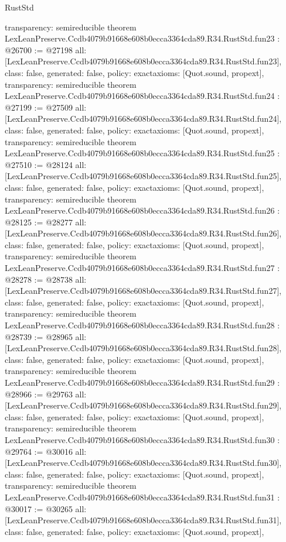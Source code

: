 \begin{lexlean}{RustStd}
\begin{coremodule}
{  transparency: semireducible
}
theorem LexLeanPreserve.Ccdb4079b91668e608b0ecca3364cda89.R34.RustStd.fun23 : @26700 := @27198 {
  all: [LexLeanPreserve.Ccdb4079b91668e608b0ecca3364cda89.R34.RustStd.fun23],
  class: false,
  generated: false,
  policy: exact{axioms: [Quot.sound, propext]},
  transparency: semireducible
}
theorem LexLeanPreserve.Ccdb4079b91668e608b0ecca3364cda89.R34.RustStd.fun24 : @27199 := @27509 {
  all: [LexLeanPreserve.Ccdb4079b91668e608b0ecca3364cda89.R34.RustStd.fun24],
  class: false,
  generated: false,
  policy: exact{axioms: [Quot.sound, propext]},
  transparency: semireducible
}
theorem LexLeanPreserve.Ccdb4079b91668e608b0ecca3364cda89.R34.RustStd.fun25 : @27510 := @28124 {
  all: [LexLeanPreserve.Ccdb4079b91668e608b0ecca3364cda89.R34.RustStd.fun25],
  class: false,
  generated: false,
  policy: exact{axioms: [Quot.sound, propext]},
  transparency: semireducible
}
theorem LexLeanPreserve.Ccdb4079b91668e608b0ecca3364cda89.R34.RustStd.fun26 : @28125 := @28277 {
  all: [LexLeanPreserve.Ccdb4079b91668e608b0ecca3364cda89.R34.RustStd.fun26],
  class: false,
  generated: false,
  policy: exact{axioms: [Quot.sound, propext]},
  transparency: semireducible
}
theorem LexLeanPreserve.Ccdb4079b91668e608b0ecca3364cda89.R34.RustStd.fun27 : @28278 := @28738 {
  all: [LexLeanPreserve.Ccdb4079b91668e608b0ecca3364cda89.R34.RustStd.fun27],
  class: false,
  generated: false,
  policy: exact{axioms: [Quot.sound, propext]},
  transparency: semireducible
}
theorem LexLeanPreserve.Ccdb4079b91668e608b0ecca3364cda89.R34.RustStd.fun28 : @28739 := @28965 {
  all: [LexLeanPreserve.Ccdb4079b91668e608b0ecca3364cda89.R34.RustStd.fun28],
  class: false,
  generated: false,
  policy: exact{axioms: [Quot.sound, propext]},
  transparency: semireducible
}
theorem LexLeanPreserve.Ccdb4079b91668e608b0ecca3364cda89.R34.RustStd.fun29 : @28966 := @29763 {
  all: [LexLeanPreserve.Ccdb4079b91668e608b0ecca3364cda89.R34.RustStd.fun29],
  class: false,
  generated: false,
  policy: exact{axioms: [Quot.sound, propext]},
  transparency: semireducible
}
theorem LexLeanPreserve.Ccdb4079b91668e608b0ecca3364cda89.R34.RustStd.fun30 : @29764 := @30016 {
  all: [LexLeanPreserve.Ccdb4079b91668e608b0ecca3364cda89.R34.RustStd.fun30],
  class: false,
  generated: false,
  policy: exact{axioms: [Quot.sound, propext]},
  transparency: semireducible
}
theorem LexLeanPreserve.Ccdb4079b91668e608b0ecca3364cda89.R34.RustStd.fun31 : @30017 := @30265 {
  all: [LexLeanPreserve.Ccdb4079b91668e608b0ecca3364cda89.R34.RustStd.fun31],
  class: false,
  generated: false,
  policy: exact{axioms: [Quot.sound, propext]},
}
\end{coremodule}
\end{lexlean}
